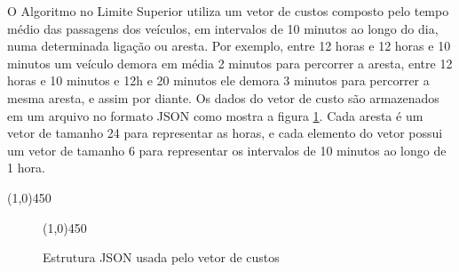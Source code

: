 O Algoritmo no Limite Superior utiliza um vetor de custos composto pelo tempo médio das passagens dos veículos, em intervalos
de 10 minutos ao longo do dia, numa determinada ligação ou aresta. Por exemplo, entre 12 horas e 12 horas e 10 minutos um
veículo demora em média 2 minutos para percorrer a aresta, entre 12 horas e 10 minutos e 12h e 20 minutos ele demora 3 minutos
para percorrer a mesma aresta, e assim por diante. Os dados do vetor de custo são armazenados em um arquivo no formato JSON
como mostra a figura \ref{fig:tabelajson}. Cada aresta é um vetor de tamanho 24 para representar as horas, e cada elemento
do vetor possui um vetor de tamanho 6 para representar os intervalos de 10 minutos ao longo de 1 hora.
\FloatBarrier
\begin{center}
  \line(1,0){450}
\end{center}

\begin{figure}[htbp]
  \begin{center}
    \line(1,0){450}
  \end{center}
  \centering
  \caption{Estrutura JSON usada pelo vetor de custos}
  \label{fig:tabelajson}
\end{figure}

